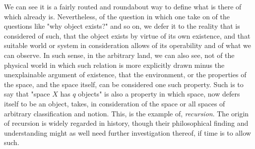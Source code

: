 We can see it is a fairly routed and roundabout way to define what is there of which already is. Nevertheless, of the question in which one take on of the questions like "why object exists?" and so on, we defer it to the reality that is considered of such, that the object exists by virtue of its own existence, and that suitable world or system in consideration allows of its operability and of what we can observe. In such sense, in the arbitrary land, we can also see, not of the physical world in which such relation is more explicitly drawn minus the unexplainable argument of existence, that the environment, or the properties of the space, and the space itself, can be considered one such property. Such is to say that "space $X$ has $q$ objects" is also a property in which space, now defers itself to be an object, takes, in consideration of the space or all spaces of arbitrary classification and notion. This, is the example of, \textit{recursion}. The origin of recursion is widely regarded in history, though their philosophical finding and understanding might as well need further investigation thereof, if time is to allow such. 


